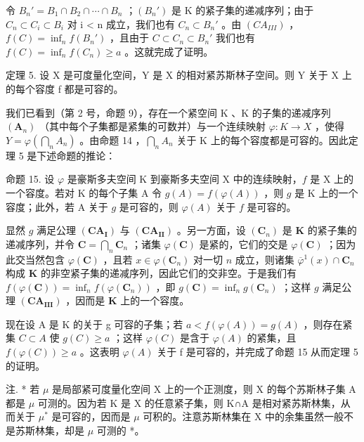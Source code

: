 令 \(B_n' = B_1 \cap B_2 \cap \cdots \cap B_n\) ；\((B_n')\) 是 K 的紧子集的递减序列；由于 \(C_n \subset C_i \subset B_i\) 对 i \textless{} n 成立，我们也有 \(C_n \subset B_n'\) 。由 \((CA_{III})\) ，\(f(C) = \inf_{n} f(B_n')\) ，且由于 \(C \subset C_n \subset B_n'\) 我们也有 \(f(C) = \inf_{n} f(C_n) \geqslant a\) 。这就完成了证明。

定理 5. 设 X 是可度量化空间，Y 是 X 的相对紧苏斯林子空间。则 Y 关于 X 上的每个容度 f 都是可容的。

我们已看到（第 2 号，命题 9），存在一个紧空间 K 、K 的子集的递减序列 \((\mathbf{A}_{n})\) （其中每个子集都是紧集的可数并）与一个连续映射 \(\varphi: K \to X\) ，使得 \(Y = \varphi\left(\bigcap_{n} A_{n}\right)\) 。由命题 14 ，\(\bigcap_{n} A_{n}\) 关于 K 上的每个容度都是可容的。因此定理 5 是下述命题的推论：

命题 15. 设 \(\varphi\) 是豪斯多夫空间 K 到豪斯多夫空间 X 中的连续映射，\(f\) 是 X 上的一个容度。若对 K 的每个子集 A 令 \(g(A) = f(\varphi(A))\) ，则 \(g\) 是 K 上的一个容度；此外，若 A 关于 \(g\) 是可容的，则 \(\varphi(A)\) 关于 \(f\) 是可容的。

显然 \(g\) 满足公理 \((\mathbf{CA}_{\mathbf{I}})\) 与 \((\mathbf{CA}_{\mathbf{II}})\) 。另一方面，设 \((\mathbf{C}_n)\) 是 \(\mathbf{K}\) 的紧子集的递减序列，并令 \(\mathbf{C} = \bigcap_{n} \mathbf{C}_n\) ；诸集 \(\varphi(\mathbf{C})\) 是紧的，它们的交是 \(\varphi(\mathbf{C})\) ；因为此交当然包含 \(\varphi(\mathbf{C})\) ，且若 \(x \in \varphi(\mathbf{C}_n)\) 对一切 \(n\) 成立，则诸集 \(\overline{\varphi}^1(x) \cap \mathbf{C}_n\) 构成 \(\mathbf{K}\) 的非空紧子集的递减序列，因此它们的交非空。于是我们有 \(f(\varphi(\mathbf{C})) = \inf_{n} f(\varphi(\mathbf{C}_n))\) ，即 \(g(\mathbf{C}) = \inf_{n} g(\mathbf{C}_n)\) ；这样 \(g\) 满足公理 \((\mathbf{CA}_{\mathbf{III}})\) ，因而是 \(\mathbf{K}\) 上的一个容度。

现在设 A 是 K 的关于 g 可容的子集；若 \(a < f(\varphi(A)) = g(A)\) ，则存在紧集 \(C \subset A\) 使 \(g(C) \geqslant a\) ；这样 \(\varphi(C)\) 是含于 \(\varphi(A)\) 的紧集，且 \(f(\varphi(C)) \geqslant a\) 。这表明 \(\varphi(A)\) 关于 f 是可容的，并完成了命题 15 从而定理 5 的证明。

注. * 若 \(\mu\) 是局部紧可度量化空间 X 上的一个正测度，则 X 的每个苏斯林子集 A 都是 \(\mu\) 可测的。因为若 K 是 X 的任意紧子集，则 K∩A 是相对紧苏斯林集，从而关于 \(\mu^{*}\) 是可容的，因而是 \(\mu\) 可积的。注意苏斯林集在 X 中的余集虽然一般不是苏斯林集，却是 \(\mu\) 可测的 *。

\appendix
\setcounter{chapter}{9}
\renewcommand{\thechapter}{\Roman{chapter}}
\setcounter{subsection}{0}
\renewcommand{\thesubsection}{\arabic{subsection}}


